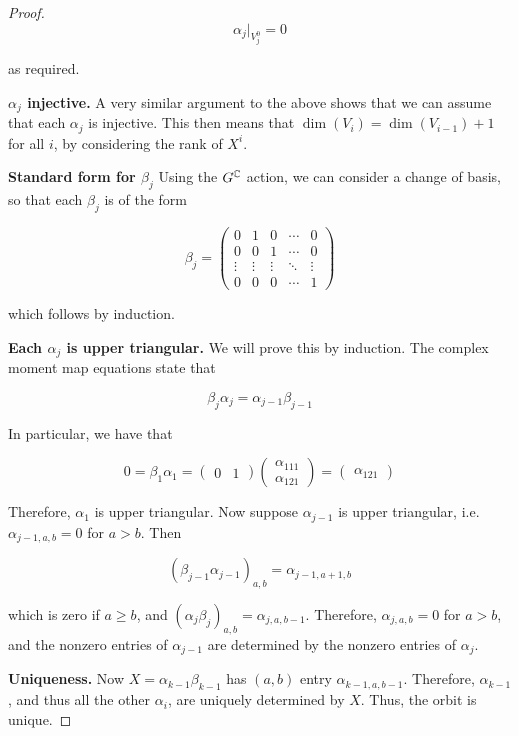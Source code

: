 \documentclass{report}
\begin{document}
\begin{proof}
    \[\alpha_j\vert_{V_j^0} = 0\]

    as required.

    \textbf{\(\alpha_j\) injective.} A very similar argument to the above shows that we can assume that each \(\alpha_j\) is injective. This then means that \(\dim(V_i) = \dim(V_{i-1}) + 1\) for all \(i\), by considering the rank of \(X^i\).

    \textbf{Standard form for \(\beta_j\)} Using the \(G^{\mathbb{C}}\) action, we can consider a change of basis, so that each \(\beta_j\) is of the form

    \[\beta_j = \begin{pmatrix}
        0 & 1 & 0 & \cdots & 0 \\
        0 & 0 & 1 & \cdots & 0 \\
        \vdots & \vdots & \vdots & \ddots & \vdots \\
        0 & 0 & 0 & \cdots & 1
    \end{pmatrix}\]

    which follows by induction.

    \textbf{Each \(\alpha_j\) is upper triangular.} We will prove this by induction. The complex moment map equations state that

    \[\beta_j\alpha_j = \alpha_{j-1}\beta_{j-1}\]

    In particular, we have that

    \[0 = \beta_1\alpha_1 = \begin{pmatrix}
        0 & 1
    \end{pmatrix}\begin{pmatrix}
        \alpha_{111} \\ \alpha_{121}
    \end{pmatrix} = \begin{pmatrix}
        \alpha_{121}
    \end{pmatrix}\]

    Therefore, \(\alpha_1\) is upper triangular. Now suppose \(\alpha_{j-1}\) is upper triangular, i.e. \(\alpha_{j-1,a,b} = 0\) for \(a > b\). Then

    \[(\beta_{j-1}\alpha_{j-1})_{a,b} = \alpha_{j-1, a+1, b}\]

    which is zero if \(a \ge b\), and \((\alpha_j\beta_j)_{a, b} = \alpha_{j, a, b-1}\). Therefore, \(\alpha_{j, a, b} = 0\) for \(a > b\), and the nonzero entries of \(\alpha_{j-1}\) are determined by the nonzero entries of \(\alpha_j\). 
    
    \textbf{Uniqueness.} Now \(X = \alpha_{k-1}\beta_{k-1}\) has \((a, b)\) entry \(\alpha_{k-1, a, b-1}\). Therefore, \(\alpha_{k-1}\), and thus all the other \(\alpha_i\), are uniquely determined by \(X\). Thus, the orbit is unique.


\end{proof}
\end{document}
